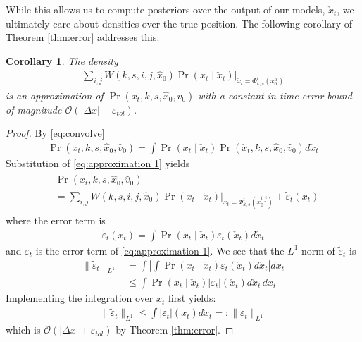 \documentclass[letterpaper,10pt,conference]{ieeeconf}
\newtheorem{cor}{Corollary}
\begin{document}
While this allows us to compute posteriors over the output of our models, $\check{x}_t$, we ultimately care about densities over the true position.
The following corollary of Theorem \ref{thm:error} addresses this:
\begin{cor} \label{cor:error}
	The density
	\begin{align}
		\sum_{i,j} W(k,s,i,j,\hat{x}_0) \left. \Pr( x_t \mid \check{x}_t ) \right|_{ \check{x}_t = \Phi_{k,s}^t( x_0^\alpha) } \label{eq:approximation 2}
	\end{align}
	is an approximation of $\Pr( x_t, k, s, \hat{x}_0, \hat{v}_0)$ with a constant in time error bound of magnitude $\mathcal{O}( |\Delta x| + \varepsilon_{tol} )$.
\end{cor}
\begin{proof}
	By \eqref{eq:convolve}
	\begin{align*}
		\Pr(x_t, k, s, \hat{x}_0, \hat{v}_0) = \int \Pr( x_t \mid \check{x}_t ) \Pr( \check{x}_t, k,s,\hat{x}_0, \hat{v}_0) d\check{x}_t
	\end{align*}
	Substitution of \eqref{eq:approximation 1} yields
	\begin{align*}
		\begin{split}
		&\Pr(x_t, k, s, \hat{x}_0, \hat{v}_0) \nonumber \\
		& = \sum_{i,j} W(k,s,i,j,\hat{x}_0) \left. \Pr( x_t \mid \check{x}_t ) \right|_{ \check{x}_t = \Phi_{k,s}^t( x_0^{i,j}) } + \tilde{\varepsilon}_t(x_t)
		\end{split}
	\end{align*}
	where the error term is
	\begin{align}
		\tilde{\varepsilon}_t(x_t) = \int \Pr( x_t \mid \check{x}_t) \varepsilon_t( \check{x}_t) d \check{x}_t
	\end{align}
	and $\varepsilon_t$ is the error term of \eqref{eq:approximation 1}.
	We see that the $L^1$-norm of $\tilde{\varepsilon}_t$ is 
	\begin{align}
		\| \tilde{\varepsilon}_t \|_{L^1} &= \int \left| \int \Pr( x_t \mid \check{x}_t) \varepsilon_t( \check{x}_t) d \check{x}_t \right| dx_t \\
			&\leq \int \Pr( x_t \mid \check{x}_t ) | \varepsilon_t |( \check{x}_t) d\check{x}_t \, dx_t
	\end{align}
	Implementing the integration over $x_t$ first yields:
	\begin{align}
		\| \tilde{\varepsilon}_t \|_{L^1} \leq \int | \varepsilon_t |( \check{x}_t) d\check{x}_t =: \| \varepsilon_t \|_{L^1}
	\end{align}
	which is $\mathcal{O}( | \Delta x | + \varepsilon_{tol} )$ by Theorem \ref{thm:error}.
\end{proof}
\end{document}
